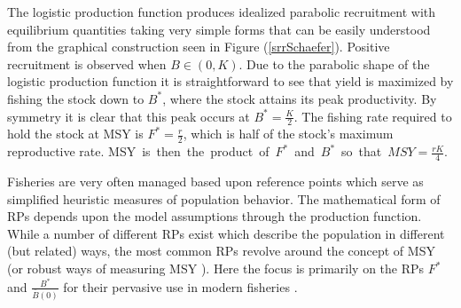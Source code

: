 \documentclass[12pt]{article}
\begin{document}
{%
The logistic production function produces idealized parabolic recruitment with 
equilibrium quantities taking very simple forms that can be easily understood from the 
graphical construction seen in Figure (\ref{srrSchaefer}). Positive 
recruitment is observed when \mbox{$B\in(0, K)$.} Due to the parabolic shape of the 
logistic production function it is straightforward to see that yield is maximized 
by fishing the stock down to $B^*$, where the stock attains its peak productivity. 
By symmetry it is clear that this peak occurs at $B^*=\frac{K}{2}$. The fishing 
rate required to hold the stock at MSY is $F^*=\frac{r}{2}$, which is half of the 
stock's maximum reproductive rate. \mbox{MSY is then the product of $F^*$ and $B^*$ 
so that $MSY=\frac{rK}{4}$.}


Fisheries are very often managed based upon reference points which serve as 
simplified heuristic measures of population behavior. The mathematical form of 
RPs depends upon the model assumptions through the production function. %
While a number of different RPs exist which describe the population in different 
(but related) ways, the most common RPs revolve around the concept of MSY (or robust 
ways of measuring MSY ).
Here the focus is primarily on the RPs $F^*$ and $\frac{B^*}{\bar B(0)}$ for their 
pervasive use in modern fisheries .


}
\end{document}
